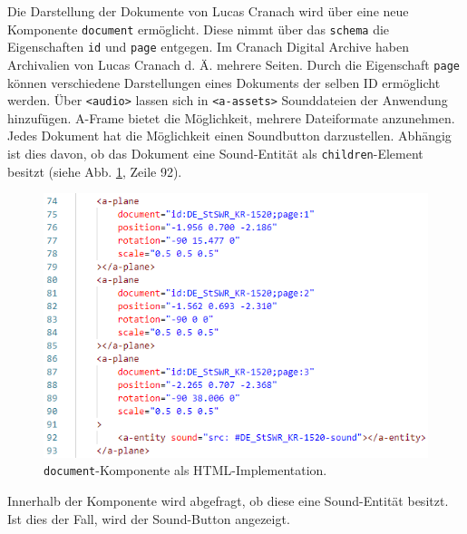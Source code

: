 \documentclass[a4paper,12pt,oneside]{article}
\begin{document}
        Die Darstellung der Dokumente von Lucas Cranach wird über eine
        neue Komponente \texttt{document} ermöglicht. Diese nimmt über das
        \texttt{schema} die Eigenschaften \texttt{id} und \texttt{page} 
        entgegen. 
        Im Cranach Digital Archive haben Archivalien von Lucas Cranach d. Ä.
        mehrere Seiten. Durch die Eigenschaft \texttt{page} können verschiedene
        Darstellungen eines Dokuments der selben ID ermöglicht werden. Über
        \texttt{<audio>} lassen sich in \texttt{<a-assets>} Sounddateien der
        Anwendung hinzufügen. A-Frame bietet die Möglichkeit, 
        mehrere Dateiformate anzunehmen. Jedes Dokument hat die Möglichkeit
        einen Soundbutton darzustellen. Abhängig ist dies davon, ob das
        Dokument eine Sound-Entität als \texttt{children}-Element besitzt
        (siehe Abb. \ref{fig:document1}, Zeile 92).
        \begin{figure}
          \centering
          \includegraphics{img/coding/document1.png}
          \caption{\texttt{document}-Komponente als HTML-Implementation.}
          \label{fig:document1}
        \end{figure}
        Innerhalb der Komponente wird abgefragt, ob diese eine Sound-Entität
        besitzt. Ist dies der Fall, wird der Sound-Button angezeigt. \\
\end{document}

